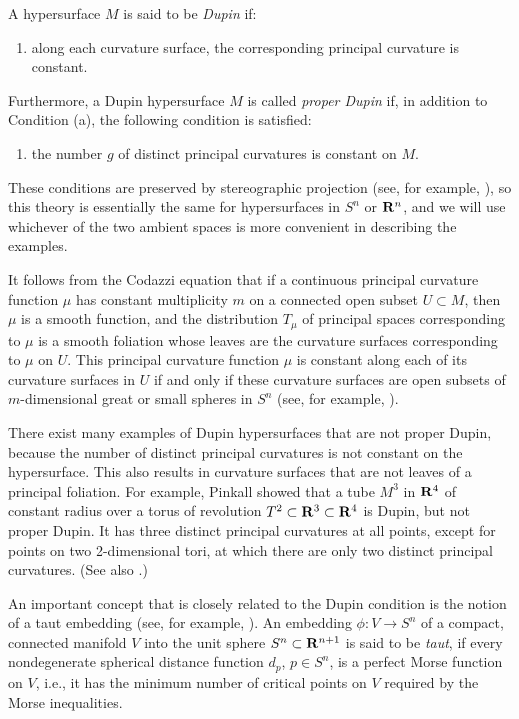 \documentclass[12pt]{article}
\begin{document}
A hypersurface $M$ is said to be {\em Dupin} if:

\begin{enumerate}
\item[(a)] along each curvature surface, the corresponding principal curvature is constant.
\end{enumerate}
Furthermore, a Dupin hypersurface $M$ is called {\em proper Dupin} if, in addition to Condition (a),
the following condition is satisfied:
\begin{enumerate}
\item[(b)] the number $g$ of distinct principal curvatures is constant on
$M$.
\end{enumerate}

These conditions are preserved by stereographic projection (see, for example, \cite[pp. 20--24]{CR8}), 
so this theory is essentially the same for hypersurfaces in 
$S^n$ or ${\bf R}^n$, and we will use whichever of the two ambient spaces is more convenient
in describing the examples.


It follows from the Codazzi equation that if a continuous principal curvature function $\mu$ has constant
multiplicity $m$ on a connected open subset $U \subset M$, then $\mu$ is a smooth function, and
the distribution $T_{\mu}$ of principal
spaces corresponding to $\mu$ is a smooth foliation whose leaves are the curvature surfaces corresponding to 
$\mu$ on $U$. This principal curvature function
$\mu$ is constant along each of its curvature surfaces in $U$
if and only if these curvature surfaces are open subsets
of $m$-dimensional great or small spheres in $S^n$ (see, for example, \cite[pp. 18--32]{CR8}).  




There exist many examples of Dupin hypersurfaces that are not proper Dupin, because the number of 
distinct principal curvatures is not constant on the hypersurface.
This also results in curvature surfaces that are not leaves of a 
principal foliation.  For example, Pinkall \cite{P4} showed that
a tube $M^3$ in ${\bf R}^4$ of constant radius over a torus of revolution 
$T^2 \subset {\bf R}^3 \subset {\bf R}^4$ is Dupin, but not proper Dupin.
It has three distinct principal curvatures at all points, except for points on two 2-dimensional tori, at which 
there are only two distinct principal curvatures.
(See also \cite[p. 69]{Cec1}.)

An important concept that is closely related to the Dupin condition is the notion of a taut embedding
(see, for example, \cite{CR7}).
An embedding $\phi:V \rightarrow S^n$ 
of a compact, connected manifold $V$ into the unit sphere $S^n \subset {\bf R}^{n+1}$ 
is said to be {\em taut}, if every nondegenerate spherical distance function $d_p$, $p \in S^n$, is a perfect
Morse function on $V$, i.e., it 
has the minimum
number of critical points  on $V$ required by the Morse inequalities. 
\end{document}

